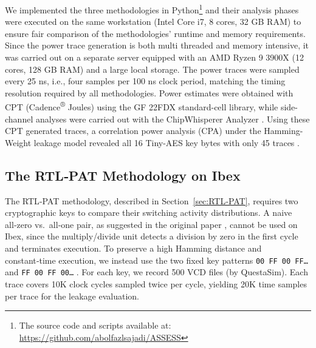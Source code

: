 \documentclass[sigconf]{acmart}
\begin{document}
We implemented the three methodologies in Python\footnote{The source code and scripts  available at: \url{https://github.com/abolfazlsajadi/ASSESS}} and their analysis phases were executed on
the same workstation (Intel Core i7, 8 cores, 32 GB RAM) to ensure fair comparison  of the methodologies' runtime
and memory requirements.  
Since the power trace generation is both multi threaded and memory intensive, it was carried out on a separate server equipped with an AMD Ryzen 9 3900X
(12 cores, 128 GB RAM) and a large local storage. The power traces were sampled every 25 ns, i.e., four samples per 100 ns clock period, matching the timing resolution required by all methodologies. Power estimates were obtained with CPT (Cadence\textsuperscript{\tiny®} Joules) using the GF 22FDX standard-cell library, while side-channel analyses were carried out with the ChipWhisperer Analyzer \cite{o2014chipwhisperer}.
Using these CPT generated traces, a correlation power analysis (CPA) under the Hamming-Weight leakage model revealed all 16 Tiny-AES key bytes with only 45 traces \cite{o2014chipwhisperer,bluebook}.
\label{sec:rtlpsc_ibex}

 
\subsection{The RTL‑PAT Methodology on Ibex}

The RTL‑PAT methodology, described in Section~\ref{sec:RTL‑PAT}, requires two cryptographic keys to compare their switching activity distributions. A naive all‑zero vs.\ all‑one pair, as suggested in the original paper \cite{RTL_PSC}, cannot be used on Ibex, since the multiply/divide unit detects a division by zero in the first cycle and terminates execution. To preserve a high Hamming distance and constant‑time execution, we instead use the two fixed key patterns \texttt{00\,FF\,00\,FF…} and \texttt{FF\,00\,FF\,00…} . For each key, we record 500 VCD files (by QuestaSim). Each trace covers 10K clock cycles sampled twice per cycle, yielding 20K time samples per trace for the leakage evaluation.
\end{document}
